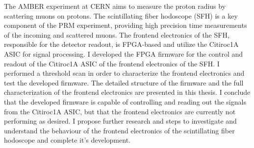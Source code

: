 The AMBER experiment at CERN aims to measure the proton radius by scattering muons on protons.
The scintillating fiber hodoscope (SFH) is a key component of the PRM experiment, providing high precision time measurements of the incoming and scattered muons.
The frontend electronics of the SFH, responsible for the detector readout, is FPGA-based and utilize the Citiroc1A ASIC for signal processing.
\newline
I developed the FPGA firmware for the control and readout of the Citiroc1A ASIC of the frontend electronics of the SFH.
\newline
I performed a threshold scan in order to characterize the frontend electronics and test the developed firmware.
\newline
The detailed structure of the firmware and the full characterization of the frontend electronics are presented in this thesis.
\newline
I conclude that the developed firmware is capable of controlling and reading out the signals from the Citiroc1A ASIC,
but that the frontend electronics are currently not performing as desired.
I propose further research and steps to investigate and understand the behaviour of the frontend electronics of the scintillating fiber hodoscope and complete it's development.
